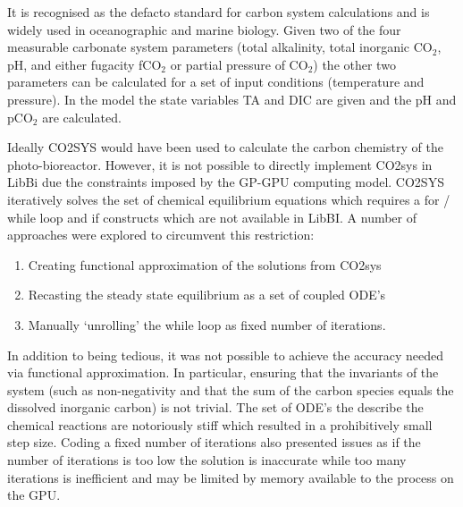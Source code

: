 \documentclass{ruthesis}
\begin{document}
It is recognised as the defacto standard for carbon system calculations and is widely used in oceanographic and marine biology.  
Given two of the four measurable carbonate system parameters (total alkalinity, total inorganic CO$_2$, pH, and either fugacity fCO$_2$ or partial pressure of CO$_2$) the other two parameters can be calculated for a set of input conditions (temperature and pressure).  In the model the state variables TA and DIC are given and the pH and pCO$_2$ are calculated.  


Ideally CO2SYS \cite{lewis1998program} would have been used to calculate the carbon chemistry of the photo-bioreactor. 
However,  it is not possible to directly implement CO2sys in LibBi due the constraints imposed by the GP-GPU computing model.  CO2SYS iteratively solves the set of chemical equilibrium equations which requires a for / while loop and if constructs which are not available in LibBI.  
A number of approaches were explored to circumvent this restriction: 
\begin{enumerate} 
	\item{} Creating functional approximation of the solutions from CO2sys 
	\item{} Recasting the steady state equilibrium as a set of coupled ODE's  
	\item{} Manually `unrolling' the while loop as fixed number of iterations.   
\end{enumerate} 

In addition to being tedious, it was not possible to achieve the accuracy needed via functional approximation.   
In particular, ensuring that the invariants of the system (such as non-negativity and that the sum of the carbon species equals the dissolved inorganic carbon) is not trivial.  
The set of ODE's the describe the chemical reactions are notoriously stiff \cite{zeebe1999time} which resulted in a prohibitively small step size.  Coding a fixed number of iterations also presented issues as if the number of iterations is too low the solution is inaccurate while too many iterations is inefficient and may be limited by memory available to the process on the GPU.  
\end{document}
